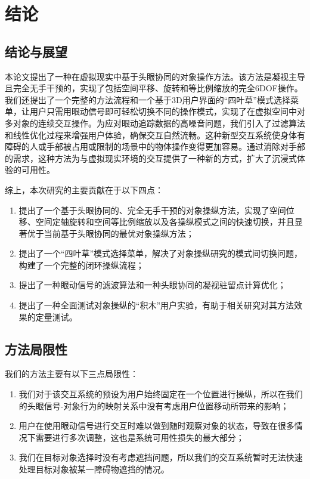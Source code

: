 \chapter{结论}

\section{结论与展望}

本论文提出了一种在虚拟现实中基于头眼协同的对象操作方法。该方法是凝视主导且完全无手干预的，实现了包括空间平移、旋转和等比例缩放的完全6DOF操作。我们还提出了一个完整的方法流程和一个基于3D用户界面的“四叶草”模式选择菜单，让用户只需用眼动信号即可轻松切换不同的操作模式，实现了在虚拟空间中对多对象的连续交互操作。为应对眼动追踪数据的高噪音问题，我们引入了过滤算法和线性优化过程来增强用户体验，确保交互自然流畅。这种新型交互系统使身体有障碍的人或手部被占用或限制的场景中的物体操作变得更加容易。通过消除对手部的需求，这种方法为与虚拟现实环境的交互提供了一种新的方式，扩大了沉浸式体验的可用性。

综上，本次研究的主要贡献在于以下四点：

\begin{enumerate}[wide]
	\item 提出了一个基于头眼协同的、完全无手干预的对象操纵方法，实现了空间位移、空间定轴旋转和空间等比例缩放以及各操纵模式之间的快速切换，并且显著优于当前基于头眼协同的最优对象操纵方法；
	\item 提出了一个“四叶草”模式选择菜单，解决了对象操纵研究的模式间切换问题，构建了一个完整的闭环操纵流程；
	\item 提出了一种眼动信号的滤波算法和一种头眼协同的凝视驻留点计算优化；
	\item 提出了一种全面测试对象操纵的“积木”用户实验，有助于相关研究对其方法效果的定量测试。
\end{enumerate}

\section{方法局限性}

我们的方法主要有以下三点局限性：
\begin{enumerate}[wide]
	\item 我们对于该交互系统的预设为用户始终固定在一个位置进行操纵，所以在我们的头眼信号-对象行为的映射关系中没有考虑用户位置移动所带来的影响；
	\item 用户在使用眼动信号进行交互时难以做到随时观察对象的状态，导致在很多情况下需要进行多次调整，这也是系统可用性损失的最大部分；
	\item 我们在目标对象选择时没有考虑遮挡问题，所以我们的交互系统暂时无法快速处理目标对象被某一障碍物遮挡的情况。
\end{enumerate}

